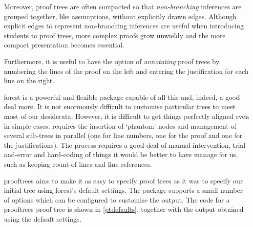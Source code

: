 \documentclass[10pt,british,a4paper]{ltxdoc}
\newcommand*\pkg[1]{\textsf{#1}}
\begin{document}
Moreover, proof trees are often compacted so that \emph{non-branching} inferences are grouped together, like assumptions, without explicitly drawn edges.
Although explicit edges to represent non-branching inferences are useful when introducing students to proof trees, more complex proofs grow unwieldy and the more compact presentation becomes essential.

Furthermore, it is useful to have the option of \emph{annotating} proof trees by numbering the lines of the proof on the left and entering the justification for each line on the right.

\pkg{forest} is a powerful and flexible package capable of all this and, indeed, a good deal more.
It is not enormously difficult to customise particular trees to meet most of our desiderata.
However, it is difficult to get things perfectly aligned even in simple cases, requires the insertion of ‘phantom’ nodes and management of several sub-trees in parallel (one for line numbers, one for the proof and one for the justifications).
The process requires a good deal of manual intervention, trial-and-error and hard-coding of things it would be better to have \LaTeXe{} manage for us, such as keeping count of lines and line references.

\pkg{prooftrees} aims to make it as easy to specify proof trees as it was to specify our initial tree using \pkg{forest}'s default settings.
The package supports a small number of options which can be configured to customise the output.
The code for a \pkg{prooftrees} proof tree is shown in \cref{ptdefaults}, together with the output obtained using the default settings.
\end{document}
